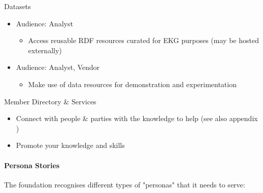 \begin{basedescript}{%
    \desclabelstyle{\multilinelabel}
    \desclabelwidth{2cm}
}
    \item[Datasets]
        \begin{itemize}
            \item Audience: Analyst
                \begin{itemize}
                    \item Access reusable RDF resources curated for EKG purposes (may be hosted externally)
                \end{itemize}
            \item Audience: Analyst, Vendor
                \begin{itemize}
                    \item Make use of data resources for demonstration and experimentation
                \end{itemize}
        \end{itemize}
    \item[Member Directory \& Services]
        \begin{itemize}
            \item Connect with people \& parties with the knowledge to help
                  (see also appendix )
            \item Promote your knowledge and skills
        \end{itemize}
\end{basedescript}

\paragraph{Persona Stories}

The foundation recognises different types of "personas" that it needs to serve:

